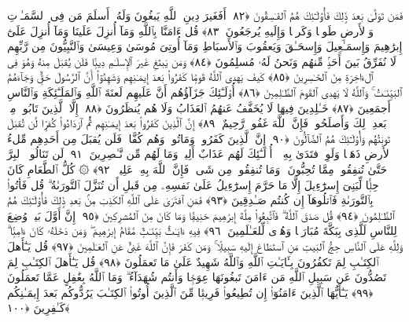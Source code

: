  فَمَن تَوَلَّىٰ بَعدَ ذَٟلِكَ فَأُو۟لَـٰٓئِكَ هُمُ ٱلفَـٰسِقُونَ ﴿٨٢﴾
 أَفَغَيرَ دِينِ ٱللَّهِ يَبغُونَ وَلَهُۥٓ أَسلَمَ مَن فِى ٱلسَّمَـٰوَٟتِ وَٱلأَرضِ طَوعًۭا وَكَرهًۭا وَإِلَيهِ يُرجَعُونَ ﴿٨٣﴾
 قُل ءَامَنَّا بِٱللَّهِ وَمَآ أُنزِلَ عَلَينَا وَمَآ أُنزِلَ عَلَىٰٓ إِبرَٰهِيمَ وَإِسمَـٰعِيلَ وَإِسحَـٰقَ وَيَعقُوبَ وَٱلأَسبَاطِ وَمَآ أُوتِىَ مُوسَىٰ وَعِيسَىٰ وَٱلنَّبِيُّونَ مِن رَّبِّهِم لَا نُفَرِّقُ بَينَ أَحَدٍۢ مِّنهُم وَنَحنُ لَهُۥ مُسلِمُونَ ﴿٨٤﴾
 وَمَن يَبتَغِ غَيرَ ٱلإِسلَـٰمِ دِينًۭا فَلَن يُقبَلَ مِنهُ وَهُوَ فِى ٱلءَاخِرَةِ مِنَ ٱلخَـٰسِرِينَ ﴿٨٥﴾
 كَيفَ يَهدِى ٱللَّهُ قَومًۭا كَفَرُوا۟ بَعدَ إِيمَـٰنِهِم وَشَهِدُوٓا۟ أَنَّ ٱلرَّسُولَ حَقٌّۭ وَجَآءَهُمُ ٱلبَيِّنَـٰتُ ۚ وَٱللَّهُ لَا يَهدِى ٱلقَومَ ٱلظَّـٰلِمِينَ ﴿٨٦﴾
 أُو۟لَـٰٓئِكَ جَزَآؤُهُم أَنَّ عَلَيهِم لَعنَةَ ٱللَّهِ وَٱلمَلَـٰٓئِكَةِ وَٱلنَّاسِ أَجمَعِينَ ﴿٨٧﴾
 خَـٰلِدِينَ فِيهَا لَا يُخَفَّفُ عَنهُمُ ٱلعَذَابُ وَلَا هُم يُنظَرُونَ ﴿٨٨﴾
 إِلَّا ٱلَّذِينَ تَابُوا۟ مِنۢ بَعدِ ذَٟلِكَ وَأَصلَحُوا۟ فَإِنَّ ٱللَّهَ غَفُورٌۭ رَّحِيمٌ ﴿٨٩﴾
 إِنَّ ٱلَّذِينَ كَفَرُوا۟ بَعدَ إِيمَـٰنِهِم ثُمَّ ٱزدَادُوا۟ كُفرًۭا لَّن تُقبَلَ تَوبَتُهُم وَأُو۟لَـٰٓئِكَ هُمُ ٱلضَّآلُّونَ ﴿٩٠﴾
 إِنَّ ٱلَّذِينَ كَفَرُوا۟ وَمَاتُوا۟ وَهُم كُفَّارٌۭ فَلَن يُقبَلَ مِن أَحَدِهِم مِّلءُ ٱلأَرضِ ذَهَبًۭا وَلَوِ ٱفتَدَىٰ بِهِۦٓ ۗ أُو۟لَـٰٓئِكَ لَهُم عَذَابٌ أَلِيمٌۭ وَمَا لَهُم مِّن نَّـٰصِرِينَ ﴿٩١﴾
 لَن تَنَالُوا۟ ٱلبِرَّ حَتَّىٰ تُنفِقُوا۟ مِمَّا تُحِبُّونَ ۚ وَمَا تُنفِقُوا۟ مِن شَىءٍۢ فَإِنَّ ٱللَّهَ بِهِۦ عَلِيمٌۭ ﴿٩٢﴾
 ۞ كُلُّ ٱلطَّعَامِ كَانَ حِلًّۭا لِّبَنِىٓ إِسرَٰٓءِيلَ إِلَّا مَا حَرَّمَ إِسرَٰٓءِيلُ عَلَىٰ نَفسِهِۦ مِن قَبلِ أَن تُنَزَّلَ ٱلتَّورَىٰةُ ۗ قُل فَأتُوا۟ بِٱلتَّورَىٰةِ فَٱتلُوهَآ إِن كُنتُم صَـٰدِقِينَ ﴿٩٣﴾
 فَمَنِ ٱفتَرَىٰ عَلَى ٱللَّهِ ٱلكَذِبَ مِنۢ بَعدِ ذَٟلِكَ فَأُو۟لَـٰٓئِكَ هُمُ ٱلظَّـٰلِمُونَ ﴿٩٤﴾
 قُل صَدَقَ ٱللَّهُ ۗ فَٱتَّبِعُوا۟ مِلَّةَ إِبرَٰهِيمَ حَنِيفًۭا وَمَا كَانَ مِنَ ٱلمُشرِكِينَ ﴿٩٥﴾
 إِنَّ أَوَّلَ بَيتٍۢ وُضِعَ لِلنَّاسِ لَلَّذِى بِبَكَّةَ مُبَارَكًۭا وَهُدًۭى لِّلعَـٰلَمِينَ ﴿٩٦﴾
 فِيهِ ءَايَـٰتٌۢ بَيِّنَـٰتٌۭ مَّقَامُ إِبرَٰهِيمَ ۖ وَمَن دَخَلَهُۥ كَانَ ءَامِنًۭا ۗ وَلِلَّهِ عَلَى ٱلنَّاسِ حِجُّ ٱلبَيتِ مَنِ ٱستَطَاعَ إِلَيهِ سَبِيلًۭا ۚ وَمَن كَفَرَ فَإِنَّ ٱللَّهَ غَنِىٌّ عَنِ ٱلعَـٰلَمِينَ ﴿٩٧﴾
 قُل يَـٰٓأَهلَ ٱلكِتَـٰبِ لِمَ تَكفُرُونَ بِـَٔايَـٰتِ ٱللَّهِ وَٱللَّهُ شَهِيدٌ عَلَىٰ مَا تَعمَلُونَ ﴿٩٨﴾
 قُل يَـٰٓأَهلَ ٱلكِتَـٰبِ لِمَ تَصُدُّونَ عَن سَبِيلِ ٱللَّهِ مَن ءَامَنَ تَبغُونَهَا عِوَجًۭا وَأَنتُم شُهَدَآءُ ۗ وَمَا ٱللَّهُ بِغَٰفِلٍ عَمَّا تَعمَلُونَ ﴿٩٩﴾
 يَـٰٓأَيُّهَا ٱلَّذِينَ ءَامَنُوٓا۟ إِن تُطِيعُوا۟ فَرِيقًۭا مِّنَ ٱلَّذِينَ أُوتُوا۟ ٱلكِتَـٰبَ يَرُدُّوكُم بَعدَ إِيمَـٰنِكُم كَـٰفِرِينَ ﴿١٠٠﴾
